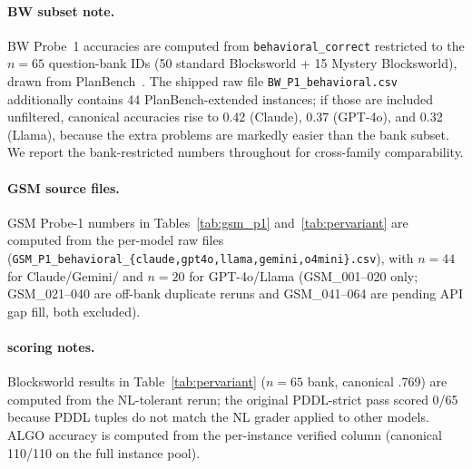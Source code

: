 \paragraph{BW subset note.}
BW Probe~1 accuracies are computed from \texttt{behavioral\_correct}
restricted to the $n{=}65$ question-bank IDs (50 standard Blocksworld + 15
Mystery Blocksworld), drawn from PlanBench~\citep{valmeekam2023planbench}. The
shipped raw file \texttt{BW\_P1\_behavioral.csv} additionally contains 44
PlanBench-extended instances; if those are included unfiltered, canonical
accuracies rise to 0.42 (Claude), 0.37 (GPT-4o), and 0.32 (Llama), because the
extra problems are markedly easier than the bank subset. We report the
bank-restricted numbers throughout for cross-family comparability.

\paragraph{GSM source files.}
GSM Probe-1 numbers in Tables~\ref{tab:gsm_p1} and~\ref{tab:pervariant} are
computed from the per-model raw files
(\texttt{GSM\_P1\_behavioral\_\{claude,gpt4o,llama,gemini,o4mini\}.csv}), with
$n{=}44$ for Claude/Gemini/\omini{} and $n{=}20$ for GPT-4o/Llama
(GSM\_001--020 only; GSM\_021--040 are off-bank duplicate reruns and
GSM\_041--064 are pending API gap fill, both excluded).

\paragraph{\omini{} scoring notes.}
\omini{} Blocksworld results in Table~\ref{tab:pervariant} ($n{=}65$ bank,
canonical .769) are computed from the NL-tolerant rerun; the original
PDDL-strict pass scored 0/65 because PDDL tuples do not match the NL grader
applied to other models. ALGO \omini{} accuracy is computed from the
per-instance verified column (canonical 110/110 on the full instance pool).



